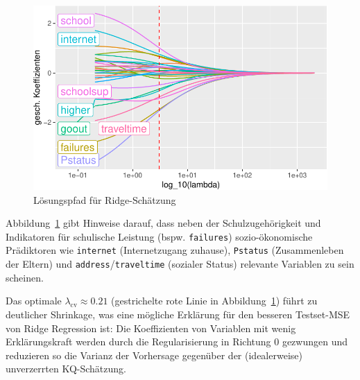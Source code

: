 \documentclass[
  a4paper,
  DIV=11,
  oneside]{scrreprt}
\begin{document}
\begin{figure}[t]

{\centering \includegraphics{RegReg_files/figure-pdf/fig-ridgAppPlot-1.pdf}

}

\caption{\label{fig-ridgAppPlot}Lösungspfad für Ridge-Schätzung}

\end{figure}

Abbildung~\ref{fig-ridgAppPlot} gibt Hinweise darauf, dass neben der
Schulzugehörigkeit und Indikatoren für schulische Leistung (bspw.
\texttt{failures}) sozio-ökonomische Prädiktoren wie \texttt{internet}
(Internetzugang zuhause), \texttt{Pstatus} (Zusammenleben der Eltern)
und \texttt{address}/\texttt{traveltime} (sozialer Status) relevante
Variablen zu sein scheinen.

Das optimale \(\lambda_\mathrm{cv} \approx 0.21\) (gestrichelte rote
Linie in Abbildung~\ref{fig-ridgAppPlot}) führt zu deutlicher Shrinkage,
was eine mögliche Erklärung für den besseren Testset-MSE von Ridge
Regression ist: Die Koeffizienten von Variablen mit wenig
Erklärungskraft werden durch die Regularisierung in Richtung 0 gezwungen
und reduzieren so die Varianz der Vorhersage gegenüber der
(idealerweise) unverzerrten KQ-Schätzung.
\end{document}
